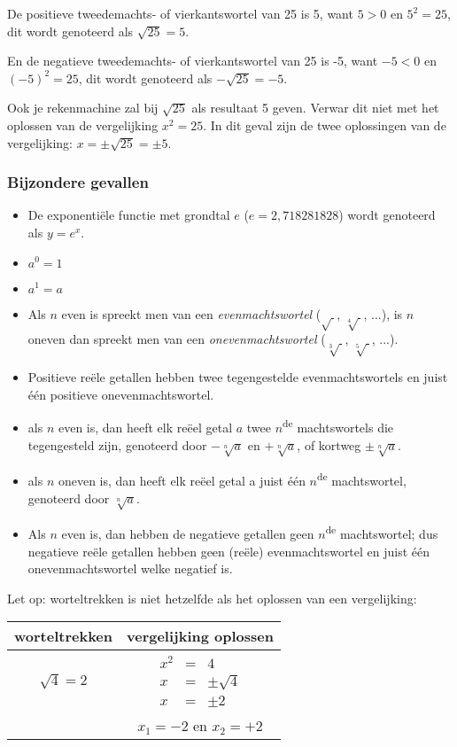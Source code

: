 \begin{opmerking}
De positieve tweedemachts- of vierkantswortel van 25 is 5, want $5>0$ en $5^{2}=25$, dit wordt genoteerd als ${\displaystyle \sqrt{25}=5}$.

En de negatieve tweedemachts- of vierkantswortel van 25 is -5, want
$-5 < 0$ en $(-5)^{2}=25$, dit wordt genoteerd als ${\displaystyle -\sqrt{25}=-5}$.

Ook je rekenmachine zal bij ${\displaystyle \sqrt{25}}$ als resultaat
5 geven. Verwar dit niet met het oplossen van de vergelijking $x^{2}=25$.
In dit geval zijn de twee oplossingen van de vergelijking: $x=\pm\sqrt{25}=\pm5$.
\end{opmerking}

\subsubsection{Bijzondere gevallen}
\begin{itemize}
\item De exponenti\"ele functie met grondtal $e$ ($e=2,718281828$) wordt
genoteerd als $y=e^{x}$.
\item $a^{0}=1$
\item $a^{1}=a$
\item Als $n$ even is spreekt men van een \emph{evenmachtswortel} ($\sqrt{\ }$,
$\sqrt[4]{\ }$, ...), is $n$ oneven dan spreekt men van een \emph{onevenmachtswortel}
($\sqrt[3]{\ }$, $\sqrt[5]{\ }$, ...).
\item Positieve re\"ele getallen hebben twee tegengestelde evenmachtswortels
en juist \'e\'en positieve onevenmachtswortel.
\item als $n$ even is, dan heeft elk re\"eel getal $a$ twee $n$\textsuperscript{de}
machtswortels die tegengesteld zijn, genoteerd door $-\sqrt[n]{a}$
en $+\sqrt[n]{a}$, of kortweg $\pm\sqrt[n]{a}$.
\item als $n$ oneven is, dan heeft elk re\"eel getal a juist \'e\'en $n$\textsuperscript{de}
machtswortel, genoteerd door $\sqrt[n]{a}$.
\item Als $n$ even is, dan hebben de negatieve getallen geen $n$\textsuperscript{de}
machtswortel; dus negatieve re\"ele getallen hebben geen (re\"ele) evenmachtswortel
en juist \'e\'en onevenmachtswortel welke negatief is.
\end{itemize}
Let op: worteltrekken is niet hetzelfde als het oplossen van een vergelijking:

\begin{tabel}{}
\begin{tabular}{c|c}
worteltrekken & vergelijking oplossen\\
\hline 
$\sqrt{4}=2$ & $\begin{array}{lll}
x^{2} & = & 4\\
x & = & \pm\sqrt{4}\\
x & = & \pm2
\end{array}$\\
\hline 
 &  $x_{1}=-2$ en $x_{2}=+2$\\
\end{tabular}
\end{tabel}


